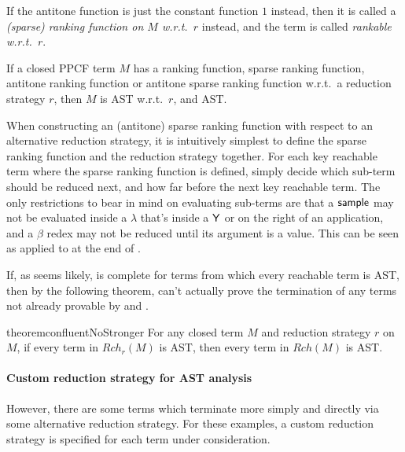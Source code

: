 If the antitone function is just the constant function $1$ instead, then it is called a \emph{(sparse) ranking function on $M$ w.r.t.~$r$} instead, and the term is called \emph{rankable w.r.t.~$r$}.

\begin{theorem} \label{thm:confluent ranking}
If a closed PPCF term $M$ has a ranking function, sparse ranking function, antitone ranking function or antitone sparse ranking function w.r.t.~a reduction strategy $r$, then $M$ is AST w.r.t.~$r$, and AST.
\end{theorem}

When constructing an (antitone) sparse ranking function with respect to an alternative reduction strategy, it is intuitively simplest to define the sparse ranking function and the reduction strategy together. For each key reachable term where the sparse ranking function is defined, simply decide which sub-term should be reduced next, and how far before the next key reachable term. The only restrictions to bear in mind on evaluating sub-terms are that a $\mathsf{sample}$ may not be evaluated inside a $\lambda$ that's inside a $\mathsf{Y}$ or on the right of an application, and a $\beta$ redex may not be reduced until its argument is a value. This can be seen as applied to  at the end of .

\medskip
If, as seems likely,  is complete for terms from which every reachable term is AST, then by the following theorem,  can't actually prove the termination of any terms not already provable by  and .

\begin{restatable}{theorem}{confluentNoStronger}
\label{thm:confluentNoStronger}
For any closed term $M$ and reduction strategy $r$ on $M$, if every term in $\mathit{Rch}_r(M)$ is AST, then every term in $\mathit{Rch}(M)$ is AST.
\end{restatable}

\paragraph*{Custom reduction strategy for AST analysis} However, there are some terms which terminate more simply and directly via some alternative reduction strategy. For these examples, a custom reduction strategy is specified for each term under consideration.

